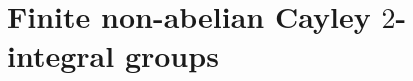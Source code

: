 \documentclass{amsart}
\newtheorem{example}{Example}[section]%
\def\Cay{{\sf Cay}} \def\Ker{{\sf Ker}}
\begin{document}
\section{Finite non-abelian Cayley $2$-integral groups}


\end{document}
